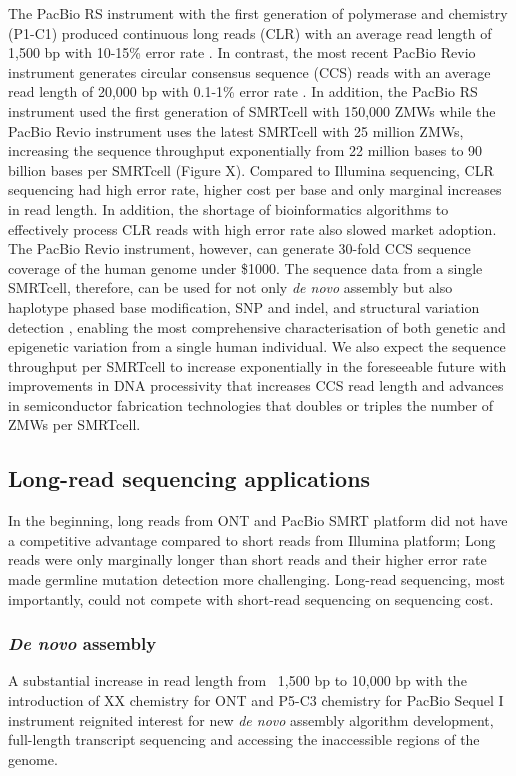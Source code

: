 The PacBio RS instrument with the first generation of polymerase and chemistry (P1-C1) produced continuous long reads (CLR) with an average read length of 1,500 bp with 10-15\% error rate \cite{}. In contrast, the most recent PacBio Revio instrument generates circular consensus sequence (CCS) reads with an average read length of 20,000 bp with 0.1-1\% error rate \cite{}. In addition, the PacBio RS instrument used the first generation of SMRTcell with 150,000 ZMWs \cite{} while the PacBio Revio instrument uses the latest SMRTcell with 25 million ZMWs, increasing the sequence throughput exponentially from 22 million bases to 90 billion bases per SMRTcell \cite{} (Figure X). Compared to Illumina sequencing, CLR sequencing had high error rate, higher cost per base and only marginal increases in read length. In addition, the shortage of bioinformatics algorithms to effectively process CLR reads with high error rate also slowed market adoption. The PacBio Revio instrument, however, can generate 30-fold CCS sequence coverage of the human genome under \$1000. The sequence data from a single SMRTcell, therefore, can be used for not only \textit{de novo} assembly \cite{} but also haplotype phased base modification\cite{}, SNP and indel, \cite{} and structural variation detection \cite{}, enabling the most comprehensive characterisation of both genetic and epigenetic variation from a single human individual. We also expect the sequence throughput per SMRTcell to increase exponentially in the foreseeable future with improvements in DNA processivity that increases CCS read length and advances in semiconductor fabrication technologies that doubles or triples the number of ZMWs per SMRTcell. 

\subsection{Long-read sequencing applications}

In the beginning, long reads from ONT and PacBio SMRT platform did not have a competitive advantage compared to short reads from Illumina platform; Long reads were only marginally longer than short reads and their higher error rate made germline mutation detection more challenging. Long-read sequencing, most importantly, could not compete with short-read sequencing on sequencing cost. 

\subsubsection{\textit{De novo} assembly}
A substantial increase in read length from ~1,500 bp to 10,000 bp with the introduction of XX chemistry for ONT and P5-C3 chemistry for PacBio Sequel I instrument reignited interest for new \textit{de novo} assembly algorithm development, full-length transcript sequencing and accessing the inaccessible regions of the genome.

